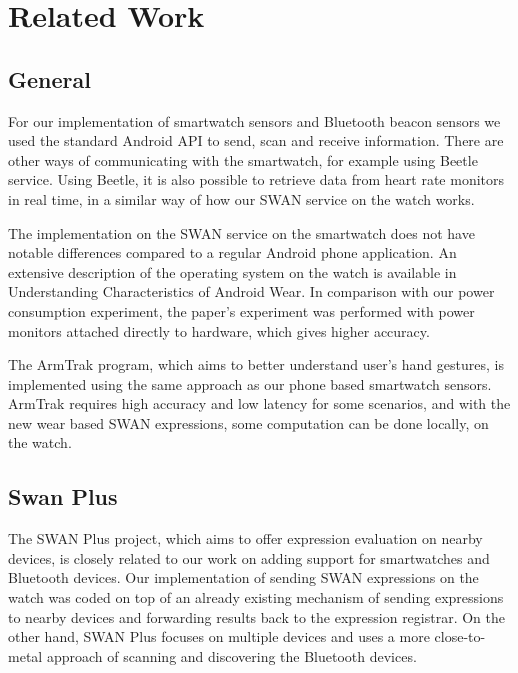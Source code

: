 
\chapter{Related Work} %

\label{Chapter2} %



\section{General}
For our implementation of smartwatch sensors and Bluetooth beacon sensors we used the standard Android API to send, scan and receive information.
There are other ways of communicating with the smartwatch, for example using Beetle\cite{beetle_mobisys16} service.
Using Beetle, it is also possible to retrieve data from heart rate monitors in real time, in a similar way of how our SWAN service on the watch works.

The implementation on the SWAN service on the smartwatch does not have notable differences compared to a regular Android phone application.
An extensive description of the operating system on the watch is available  in Understanding Characteristics of Android Wear\cite{android_wear_char}.
In comparison with our power consumption experiment, the paper's experiment was performed  with power monitors attached 
directly to hardware, which gives higher accuracy.

The ArmTrak\cite{arm_trak} program, which aims to better understand user's hand gestures, is implemented using the same approach as our phone based 
smartwatch sensors. ArmTrak requires high accuracy and low latency for some scenarios, and with the new wear based SWAN expressions, some computation can be
done locally, on the watch.

\section{Swan Plus}
The SWAN Plus\cite{swan_plus} project, which aims to offer expression evaluation on nearby devices, is closely related to our work on adding support for smartwatches and Bluetooth devices.
Our implementation of sending SWAN expressions on the watch was coded on top of an already existing mechanism of sending expressions to nearby devices and forwarding results back to the expression
registrar. On the other hand, SWAN Plus focuses on multiple devices and uses a more close-to-metal approach of scanning and discovering the Bluetooth devices.

